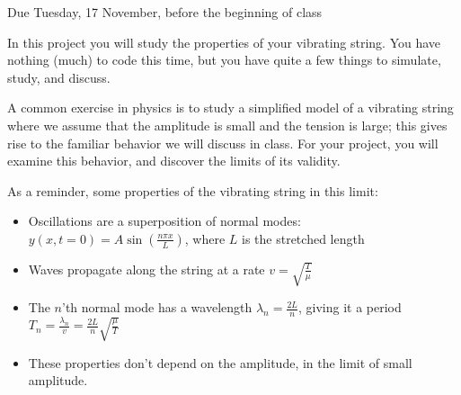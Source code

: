 \documentclass[12pt]{article}
\begin{document}
\Large
\centerline{}
\centerline{Due Tuesday, 17 November, before the beginning of class}
\normalsize


In this project you will study the properties of your vibrating string. You have nothing (much) to code this time, but you have quite a few things to simulate, study, and discuss.

A common exercise in physics is to study a simplified model of a vibrating string where we assume that the amplitude is small and 
the tension is large; this gives rise to the familiar behavior we will discuss in class. For your project, you will examine this behavior, and discover the limits of its validity.

As a reminder, some properties of the vibrating string in this limit:

\begin{itemize}
\item{Oscillations are a superposition of normal modes: $y(x,t=0) = A \sin \left(\frac{n\pi x}{L}\right)$, where $L$ is the stretched length}
\item{Waves propagate along the string at a rate $v=\sqrt {\frac{T}{\mu}}$}
\item{The $n$'th normal mode has a wavelength $\lambda_n=\frac{2L}{n}$, giving it a period $T_n=\frac{\lambda_n}{v}=\frac{2L}{n} \sqrt{  \frac{\mu}{T}}$}
\item{These properties don't depend on the amplitude, in the limit of small amplitude.}
\end{itemize}
\end{document}
